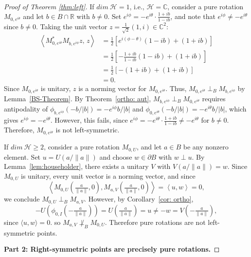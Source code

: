 \documentclass[12pt]{amsart}
\theoremstyle{definition}
\renewcommand{\H}{\mathcal{H}}
\begin{document}
\begin{proof}[Proof of Theorem \ref{thm:left}]
\noindent If $dim ~\H=1$, i.e., $\H=\mathbb{C}$, consider a pure rotation $M_{0,e^{i\theta}}$ and let 
$b \in B \cap \mathbb{R}$ with $b \neq 0$. Set 
$e^{i\phi} = -e^{i\theta}\cdot\frac{1+ib}{1-ib}$, and 
note that $e^{i\phi} \neq -e^{i\theta}$ since 
$b \neq 0$. Taking the unit vector 
$z = \frac{1}{\sqrt{2}}(1, i) \in \mathbb{C}^2$:
\begin{align*}
\left\langle M_{0,e^{i\theta}}^*M_{b,e^{i\phi}}z,\, 
z\right\rangle
&= \frac{1}{2}\!\left[e^{i(\phi-\theta)}(1-ib) 
+ (1+ib)\right]\\
& = \frac{1}{2}\!\left[-\frac{1+ib}{1-ib}(1-ib) 
+ (1+ib)\right]\\
& = \frac{1}{2}\!\left[-(1+ib) + (1+ib)\right]\\
& = 0.
\end{align*}
Since $M_{0,e^{i\theta}}$ is unitary, $z$ is a norming 
vector for $M_{0,e^{i\theta}}$. Thus, $M_{0,e^{i\theta}} \perp_B M_{b,e^{i\phi}}$ by 
Lemma~\ref{BS-Theorem}. By Theorem~\ref{ortho: aut}, 
$M_{b,e^{i\phi}} \perp_B M_{0,e^{i\theta}}$ requires 
antipodality of $\phi_{b,e^{i\phi}}(-b/|b|) 
= -e^{i\phi}b/|b|$ and 
$\phi_{0,e^{i\theta}}(-b/|b|) = -e^{i\theta}b/|b|$, 
which gives $e^{i\phi} = -e^{i\theta}$. However, this fails, since
$e^{i\phi} = -e^{i\theta}\cdot\frac{1+ib}{1-ib} 
\neq -e^{i\theta}$ for $b \neq 0$. 
Therefore, $M_{0,e^{i\theta}}$ is not left-symmetric.

\bigskip

\noindent If $dim ~ \H \geq 2$, consider a pure rotation $M_{0,U}$, and let $a \in B$ be any nonzero element. Set 
$u = U\!\left(a/\|a\|\right)$ and choose $w \in 
\partial B$ with $w \perp u$. By Lemma~\ref{lem:householder}, 
there exists a unitary $V$ with $V\!\left(a/\|a\|\right) 
= w$. Since $M_{0,U}$ is unitary, every unit vector is a norming 
vector, and since
\[
\left\langle M_{0,U}\!\left(\tfrac{a}{\|a\|},0\right), 
M_{a,V}\!\left(\tfrac{a}{\|a\|},0\right)\right\rangle 
= \left\langle u, w\right\rangle = 0,
\]
we conclude $M_{0,U} \perp_B M_{a,V}$. However, by 
Corollary~\ref{cor: ortho},
\[
-U\!\left(\phi_{0,I}\!\left(-\tfrac{a}{\|a\|}\right)\right) 
= U\!\left(\tfrac{a}{\|a\|}\right) = u \neq -w 
= V\!\left(-\tfrac{a}{\|a\|}\right),
\]
since $\langle u, w\rangle = 0$.
so $M_{a,V} \not\perp_B M_{0,U}$. Therefore pure rotations 
are not left-symmetric points.


\medskip



\noindent\textbf{Part 2: Right-symmetric points are 
precisely pure rotations.}




\end{proof}
\end{document}
